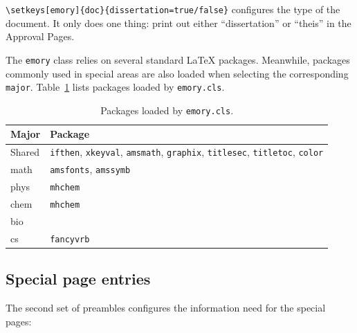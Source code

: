\documentclass[draft]{emory}
\begin{document}
\Verb|\setkeys[emory]{doc}{dissertation=true/false}| configures the type of the 
document. It only does one thing: print out either ``dissertation'' or ``theis''
in the Approval Pages.

The \Verb|emory| class relies on several standard \LaTeX{} packages. Meanwhile, 
packages commonly used in special areas are also loaded when selecting the 
corresponding \Verb|major|. 
Table~\ref{tbl:packages} lists packages loaded by \Verb|emory.cls|.
\begin{table}[htp!]
  \centering
  \caption{Packages loaded by \protect\Verb|emory.cls|. \label{tbl:packages}}
  \begin{tabular}{l l}
    \hline
    Major & Package \\
    \hline
    Shared & \protect\Verb|ifthen|, \protect\Verb|xkeyval|, \protect\Verb|amsmath|,
             \protect\Verb|graphix|, \protect\Verb|titlesec|, 
             \protect\Verb|titletoc|, \protect\Verb|color| \\
    math & \protect\Verb|amsfonts|, \protect\Verb|amssymb| \\
    phys & \protect\Verb|mhchem| \\
    chem & \protect\Verb|mhchem| \\
    bio & \\
    cs & \protect\Verb|fancyvrb| \\
    \hline
  \end{tabular}
\end{table}


\subsection{Special page entries}
The second set of preambles configures the information need for the special pages:
\end{document}
